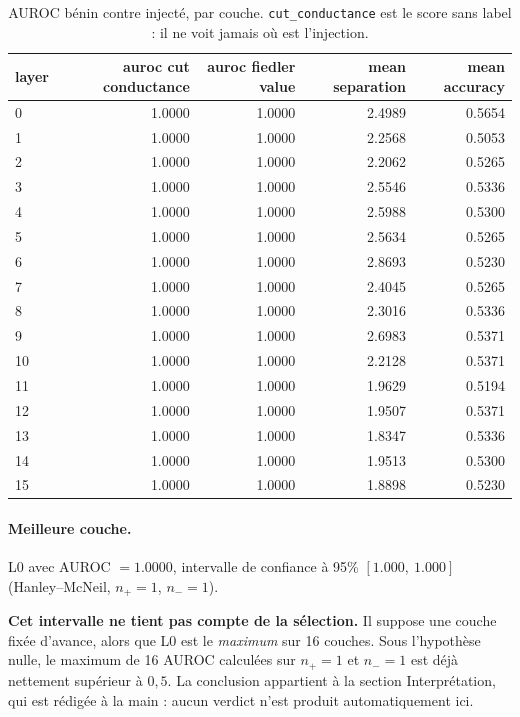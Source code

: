 \documentclass[11pt,a4paper]{article}
\begin{document}
\begin{table}[htbp]
\centering
\small
\begin{tabular}{lrrrr}
\hline
layer & auroc cut conductance & auroc fiedler value & mean separation & mean accuracy \\
\hline
0 & 1.0000 & 1.0000 & 2.4989 & 0.5654 \\
1 & 1.0000 & 1.0000 & 2.2568 & 0.5053 \\
2 & 1.0000 & 1.0000 & 2.2062 & 0.5265 \\
3 & 1.0000 & 1.0000 & 2.5546 & 0.5336 \\
4 & 1.0000 & 1.0000 & 2.5988 & 0.5300 \\
5 & 1.0000 & 1.0000 & 2.5634 & 0.5265 \\
6 & 1.0000 & 1.0000 & 2.8693 & 0.5230 \\
7 & 1.0000 & 1.0000 & 2.4045 & 0.5265 \\
8 & 1.0000 & 1.0000 & 2.3016 & 0.5336 \\
9 & 1.0000 & 1.0000 & 2.6983 & 0.5371 \\
10 & 1.0000 & 1.0000 & 2.2128 & 0.5371 \\
11 & 1.0000 & 1.0000 & 1.9629 & 0.5194 \\
12 & 1.0000 & 1.0000 & 1.9507 & 0.5371 \\
13 & 1.0000 & 1.0000 & 1.8347 & 0.5336 \\
14 & 1.0000 & 1.0000 & 1.9513 & 0.5300 \\
15 & 1.0000 & 1.0000 & 1.8898 & 0.5230 \\
\hline
\end{tabular}
\caption{AUROC bénin contre injecté, par couche. \texttt{cut\_conductance} est le score sans label : il ne voit jamais où est l'injection.}
\label{tab:layers}
\end{table}


\paragraph{Meilleure couche.} L0 avec
AUROC $= 1.0000$, intervalle de confiance à 95\%
$[1.000,\ 1.000]$ (Hanley--McNeil, $n_+ = 1$, $n_- = 1$).



\textbf{Cet intervalle ne tient pas compte de la sélection.} Il suppose une
couche fixée d'avance, alors que L0 est le \emph{maximum} sur
16 couches. Sous l'hypothèse nulle, le maximum de
16 AUROC calculées sur $n_+ = 1$ et $n_- = 1$ est déjà
nettement supérieur à $0{,}5$. La conclusion appartient à la section
Interprétation, qui est rédigée à la main : aucun verdict n'est produit
automatiquement ici.
\end{document}
